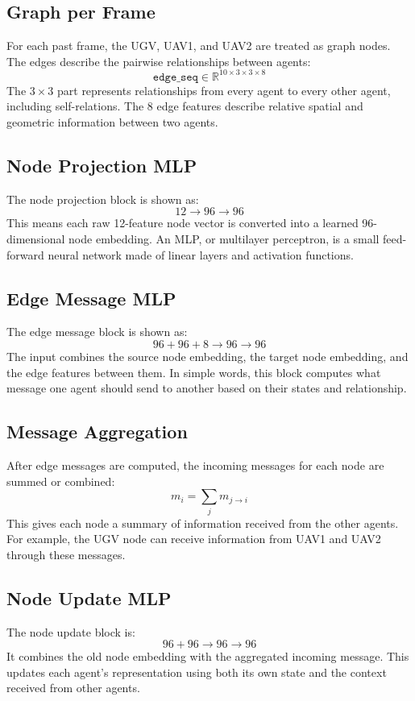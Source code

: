 \documentclass[11pt,a4paper]{article}
\begin{document}
\subsection*{Graph per Frame}
For each past frame, the UGV, UAV1, and UAV2 are treated as graph nodes. The
edges describe the pairwise relationships between agents:
\[
    \texttt{edge\_seq} \in \mathbb{R}^{10 \times 3 \times 3 \times 8}
\]
The \(3 \times 3\) part represents relationships from every agent to every other
agent, including self-relations. The 8 edge features describe relative spatial
and geometric information between two agents.

\subsection*{Node Projection MLP}
The node projection block is shown as:
\[
    12 \rightarrow 96 \rightarrow 96
\]
This means each raw 12-feature node vector is converted into a learned
96-dimensional node embedding. An MLP, or multilayer perceptron, is a small
feed-forward neural network made of linear layers and activation functions.

\subsection*{Edge Message MLP}
The edge message block is shown as:
\[
    96 + 96 + 8 \rightarrow 96 \rightarrow 96
\]
The input combines the source node embedding, the target node embedding, and
the edge features between them. In simple words, this block computes what
message one agent should send to another based on their states and relationship.

\subsection*{Message Aggregation}
After edge messages are computed, the incoming messages for each node are
summed or combined:
\[
    m_i = \sum_{j} m_{j \rightarrow i}
\]
This gives each node a summary of information received from the other agents.
For example, the UGV node can receive information from UAV1 and UAV2 through
these messages.

\subsection*{Node Update MLP}
The node update block is:
\[
    96 + 96 \rightarrow 96 \rightarrow 96
\]
It combines the old node embedding with the aggregated incoming message. This
updates each agent's representation using both its own state and the context
received from other agents.
\end{document}
